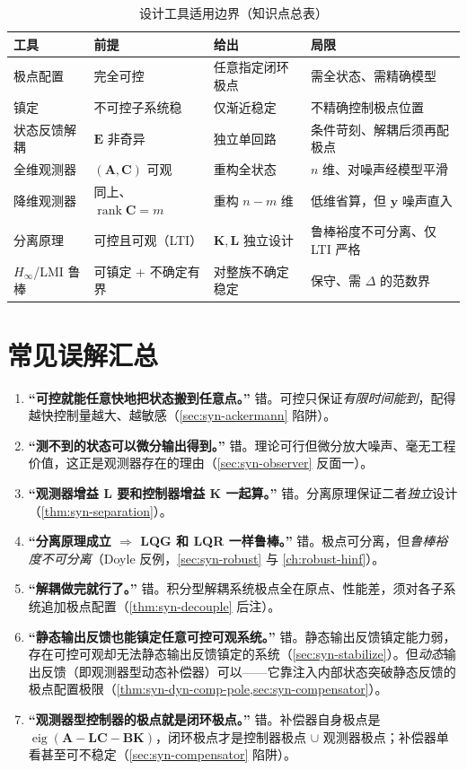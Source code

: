 \begin{table}[H]\centering\small
\caption{设计工具适用边界（知识点总表）}
\begin{tabular}{llll}
\toprule
工具 & 前提 & 给出 & 局限 \\
\midrule
极点配置 & 完全可控 & 任意指定闭环极点 & 需全状态、需精确模型 \\
镇定 & 不可控子系统稳 & 仅渐近稳定 & 不精确控制极点位置 \\
状态反馈解耦 & $\mathbf E$ 非奇异 & 独立单回路 & 条件苛刻、解耦后须再配极点 \\
全维观测器 & $(\mathbf A,\mathbf C)$ 可观 & 重构全状态 & $n$ 维、对噪声经模型平滑 \\
降维观测器 & 同上、$\operatorname{rank}\mathbf C=m$ & 重构 $n-m$ 维 & 低维省算，但 $\mathbf y$ 噪声直入 \\
分离原理 & 可控且可观（LTI） & $\mathbf K,\mathbf L$ 独立设计 & 鲁棒裕度不可分离、仅 LTI 严格 \\
$H_\infty$/LMI 鲁棒 & 可镇定 + 不确定有界 & 对整族不确定稳定 & 保守、需 $\Delta$ 的范数界 \\
\bottomrule
\end{tabular}
\end{table}

\section*{常见误解汇总}
\begin{enumerate}
  \item \textbf{“可控就能任意快地把状态搬到任意点。”}\; 错。可控只保证\emph{有限时间能到}，配得越快控制量越大、越敏感（\cref{sec:syn-ackermann} 陷阱）。
  \item \textbf{“测不到的状态可以微分输出得到。”}\; 错。理论可行但微分放大噪声、毫无工程价值，这正是观测器存在的理由（\cref{sec:syn-observer} 反面一）。
  \item \textbf{“观测器增益 $\mathbf L$ 要和控制器增益 $\mathbf K$ 一起算。”}\; 错。分离原理保证二者\emph{独立}设计（\cref{thm:syn-separation}）。
  \item \textbf{“分离原理成立 $\Rightarrow$ LQG 和 LQR 一样鲁棒。”}\; 错。极点可分离，但\emph{鲁棒裕度不可分离}（Doyle 反例，\cref{sec:syn-robust} 与 \cref{ch:robust-hinf}）。
  \item \textbf{“解耦做完就行了。”}\; 错。积分型解耦系统极点全在原点、性能差，须对各子系统追加极点配置（\cref{thm:syn-decouple} 后注）。
  \item \textbf{“静态输出反馈也能镇定任意可控可观系统。”}\; 错。静态输出反馈镇定能力弱，存在可控可观却无法静态输出反馈镇定的系统（\cref{sec:syn-stabilize}）。但\emph{动态}输出反馈（即观测器型动态补偿器）可以——它靠注入内部状态突破静态反馈的极点配置极限（\cref{thm:syn-dyn-comp-pole,sec:syn-compensator}）。
  \item \textbf{“观测器型控制器的极点就是闭环极点。”}\; 错。补偿器自身极点是 $\operatorname{eig}(\mathbf A-\mathbf L\mathbf C-\mathbf B\mathbf K)$，闭环极点才是控制器极点 $\cup$ 观测器极点；补偿器单看甚至可不稳定（\cref{sec:syn-compensator} 陷阱）。
\end{enumerate}

